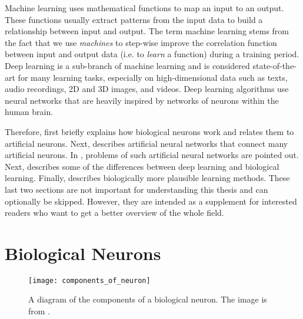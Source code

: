 Machine learning uses mathematical functions to map an input to an output.
These functions usually extract patterns from the input data to build a relationship between input and output.
The term machine learning stems from the fact that we use \emph{machines} to step-wise improve the correlation function between input and output data (i.e. to \emph{learn} a function) during a training period.
Deep learning is a sub-branch of machine learning and is considered state-of-the-art for many learning tasks, especially on high-dimensional data such as texts, audio recordings, 2D and 3D images, and videos.
Deep learning algorithms use neural networks that are heavily inspired by networks of neurons within the human brain.

Therefore,  first briefly explains how biological neurons work and relates them to artificial neurons.
Next,  describes artificial neural networks that connect many artificial neurons.
In , problems of such artificial neural networks are pointed out.
Next,  describes some of the differences between deep learning and biological learning. Finally,  describes biologically more plausible learning methods.
These last two sections are not important for understanding this thesis and can optionally be skipped. However, they are intended as a supplement for interested readers who want to get a better overview of the whole field.

\section{Biological Neurons}
\begin{figure}[h]
    \centering
    \texttt{[image: components\_of\_neuron]}
    \caption[Diagram of the components of a biological neuron]{A diagram of the components of a biological neuron. The image is from .}
\end{figure}

